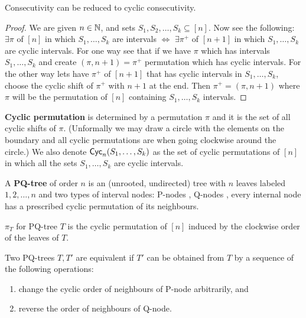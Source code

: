 \begin{lemma}
	Consecutivity can be reduced to cyclic consecutivity.
\end{lemma}

\begin{proof}
	We are given $n \in \mathbb{N}$, and sets $S_1, S_2, \dots, S_k \subseteq [n]$. Now see the following: $\exists \pi$ of $[n]$ in which $S_1, \dots, S_k$ are intervals $\iff$ $\exists \pi^+$ of $[n+1]$ in which $S_1, \dots, S_k$ are cyclic intervals. For one way see that if we have $\pi$ which has intervals $S_1, \dots, S_k$ and create $(\pi, n+1) = \pi^+$ permutation which has cyclic intervals. For the other way lets have $\pi^+$ of $[n+1]$ that has cyclic intervals in $S_1, \dots, S_k$, choose the cyclic shift of $\pi^+$ with $n+1$ at the end. Then $\pi^+ = (\pi, n+1)$ where $\pi$ will be the permutation of $[n]$ containing $S_1, \dots, S_k$ intervals.
\end{proof}

\textbf{Cyclic permutation} is determined by a permutation $\pi$ and it is the set of all cyclic shifts of $\pi$. (Unformally we may draw a circle with the elements on the boundary and all cyclic permutations are when going clockwise around the circle.) We also denote $\textsf{Cyc}_{n}(S_1, \dots, S_k)$ as the set of cyclic permutations of $[n]$ in which all the sets $S_1, \dots, S_k$ are cyclic intervals.

\begin{defn}
	A \textbf{PQ-tree} of order $n$ is an (unrooted, undirected) tree with $n$ leaves labeled $1,2, \dots, n$ and two types of interval nodes: P-nodes \faCircle, Q-nodes \faCircle[regular], every internal node has a prescribed cyclic permutation of its neighbours.
\end{defn}

\begin{defn}
	$\pi_T$ for PQ-tree $T$ is the cyclic permutation of $[n]$ induced by the clockwise order of the leaves of $T$.
\end{defn}

\begin{defn}
	Two PQ-trees $T,T'$ are equivalent if $T'$ can be obtained from $T$ by a sequence of the following operations:
	
	\begin{enumerate}
		\item change the cyclic order of neighbours of P-node arbitrarily, and
		\item reverse the order of neighbours of Q-node.
	\end{enumerate}
\end{defn}


